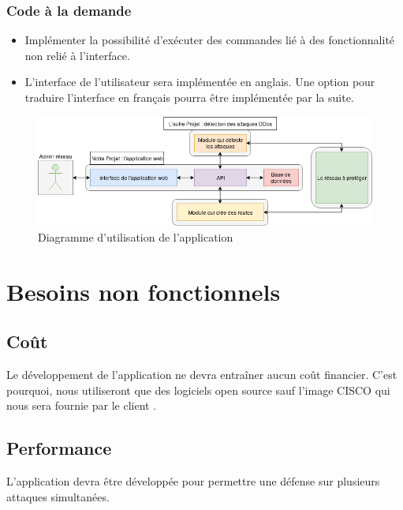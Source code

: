 
\subsubsection{Code à la demande}
\begin{itemize}
    \item Implémenter la possibilité d'exécuter des commandes lié à des fonctionnalité non relié à l'interface.
    \item L'interface de l'utilisateur sera implémentée en anglais. Une option pour traduire l'interface en français pourra être implémentée par la suite.
\end{itemize}

\begin{figure}[H]
    \includegraphics[width=\textwidth]{./medias/use_cases.png}
    \caption{Diagramme d'utilisation de l'application}
    \label{fig:use_cases}
\end{figure}

\newpage

\section{Besoins non fonctionnels}

\subsection{Coût}
Le développement de l'application ne devra entraîner aucun coût financier. C'est pourquoi, nous utiliseront que des logiciels open source sauf l'image CISCO qui nous sera fournie par le client .

\subsection{Performance}
L'application devra être développée pour permettre une défense sur plusieurs attaques simultanées. %

